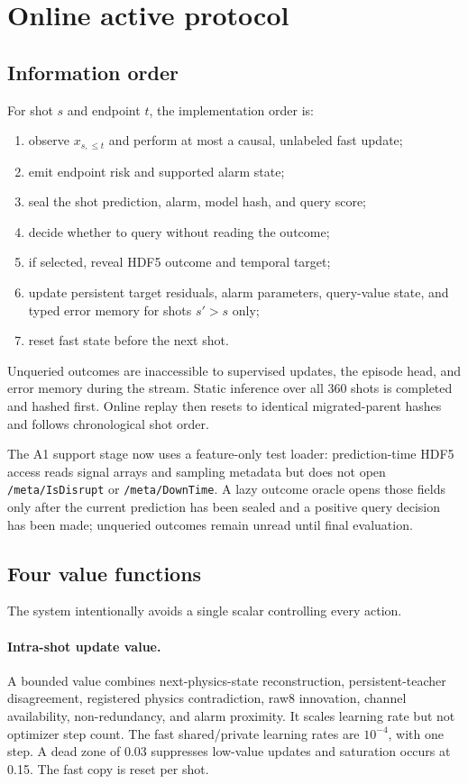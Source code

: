 \documentclass[10pt]{article}
\newcommand{\code}[1]{\nolinkurl{#1}}
\begin{document}
\section{Online active protocol}

\subsection{Information order}

For shot $s$ and endpoint $t$, the implementation order is:
\begin{enumerate}
  \item observe $x_{s,\le t}$ and perform at most a causal, unlabeled fast update;
  \item emit endpoint risk and supported alarm state;
  \item seal the shot prediction, alarm, model hash, and query score;
  \item decide whether to query without reading the outcome;
  \item if selected, reveal HDF5 outcome and temporal target;
  \item update persistent target residuals, alarm parameters, query-value state, and typed error memory for shots $s'>s$ only;
  \item reset fast state before the next shot.
\end{enumerate}
Unqueried outcomes are inaccessible to supervised updates, the episode head, and error memory during the stream.  Static inference over all 360 shots is completed and hashed first.  Online replay then resets to identical migrated-parent hashes and follows chronological shot order.

The A1 support stage now uses a feature-only test loader: prediction-time HDF5 access reads signal arrays and sampling metadata but does not open \code{/meta/IsDisrupt} or \code{/meta/DownTime}.  A lazy outcome oracle opens those fields only after the current prediction has been sealed and a positive query decision has been made; unqueried outcomes remain unread until final evaluation.

\subsection{Four value functions}

The system intentionally avoids a single scalar controlling every action.

\paragraph{Intra-shot update value.}
A bounded value combines next-physics-state reconstruction, persistent-teacher disagreement, registered physics contradiction, raw8 innovation, channel availability, non-redundancy, and alarm proximity.  It scales learning rate but not optimizer step count.  The fast shared/private learning rates are $10^{-4}$, with one step.  A dead zone of 0.03 suppresses low-value updates and saturation occurs at 0.15.  The fast copy is reset per shot.
\end{document}
